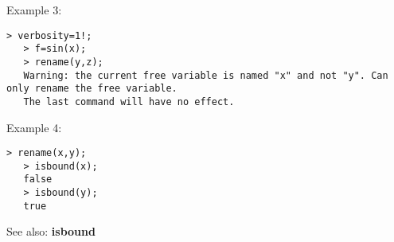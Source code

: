 \noindent Example 3: 
\begin{center}\begin{minipage}{14.8cm}\begin{Verbatim}[frame=single]
   > verbosity=1!;
   > f=sin(x);
   > rename(y,z);
   Warning: the current free variable is named "x" and not "y". Can only rename the free variable.
   The last command will have no effect.
\end{Verbatim}
\end{minipage}\end{center}
\noindent Example 4: 
\begin{center}\begin{minipage}{14.8cm}\begin{Verbatim}[frame=single]
   > rename(x,y);
   > isbound(x);
   false
   > isbound(y);
   true
\end{Verbatim}
\end{minipage}\end{center}
See also: \textbf{isbound}
